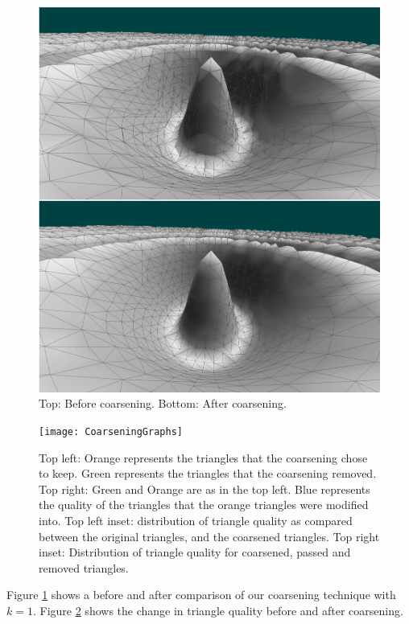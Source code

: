 \documentclass[journal]{vgtc}                %
\begin{document}
\begin{figure}[!ht]
\includegraphics[width=\columnwidth]{Coarsening}
\caption{Top: Before coarsening. Bottom: After coarsening.}
\label{fig:coarsening}
\end{figure}

\begin{figure}[!ht]
\texttt{[image: CoarseningGraphs]}
\caption{Top left: Orange represents the triangles that the coarsening chose to keep. Green represents the triangles that the coarsening removed. Top right: Green and Orange are as in the top left. Blue represents the quality of the triangles that the orange triangles were modified into. Top left inset: distribution of triangle quality as compared between the original triangles, and the coarsened triangles. Top right inset: Distribution of triangle quality for coarsened, passed and removed triangles.}
\label{fig:coarseninggraphs}
\end{figure}


Figure \ref{fig:coarsening} shows a before and after comparison of our coarsening technique with $k=1$. 
Figure \ref{fig:coarseninggraphs} shows the change in triangle quality before and after coarsening.
\end{document}
